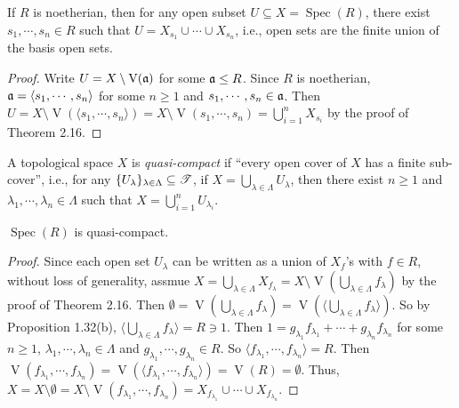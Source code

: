 \begin{proposition}
    If $R$ is noetherian, then for any open subset $U \subseteq X = \operatorname{Spec}(R)$, there exist $s_1,\cdots,s_n \in R$ such that $U = X_{s_1} \cup \cdots \cup X_{s_n}$, i.e., open sets are the finite union of the basis open sets.
\end{proposition}

\begin{proof}
    Write $U = X \setminus \operatorname{V}(\mathfrak{a})$ for some $\mathfrak{a} \leq R$. Since $R$ is noetherian, $\mathfrak{a} = \langle s_1,\cdots,s_n \rangle$ for some $n \geq 1$ and $s_1,\cdots,s_n \in \mathfrak{a}$. Then $U = X \setminus \operatorname{V}(\langle s_1,\cdots,s_n \rangle) = X \setminus \operatorname{V}(s_1,\cdots,s_n) = \bigcup_{i=1}^n X_{s_i}$ by the proof of Theorem 2.16.
\end{proof}

\begin{definition}
    A topological space $X$ is \emph{quasi-compact} if ``every open cover of $X$ has a finite sub-cover'', i.e., for any $\{U_\lambda\}_{\lambda \in \Lambda} \subseteq \mathscr{T}$, if $X = \bigcup_{\lambda \in \Lambda} U_\lambda$, then there exist $n \geq 1$ and $\lambda_1,\cdots,\lambda_n \in \Lambda$ such that $X = \bigcup_{i=1}^n U_{\lambda_i}$.
\end{definition}

\begin{theorem}
    $\operatorname{Spec}(R)$ is quasi-compact.
\end{theorem}

\begin{proof}
    Since each open set $U_\lambda$ can be written as a union of $X_f$'s with $f \in R$, without loss of generality, assmue $X = \bigcup_{\lambda \in \Lambda} X_{f_\lambda} = X \setminus \operatorname{V}(\bigcup_{\lambda \in \Lambda}f_{\lambda})$ by the proof of Theorem 2.16. Then $\emptyset = \operatorname{V}(\bigcup_{\lambda \in \Lambda}f_{\lambda}) = \operatorname{V}(\langle \bigcup_{\lambda \in \Lambda}f_{\lambda} \rangle)$. So by Proposition 1.32(b), $\langle \bigcup_{\lambda \in \Lambda}f_{\lambda} \rangle = R \ni 1$. Then $1 = g_{\lambda_1} f_{\lambda_1} + \cdots + g_{\lambda_n}f_{\lambda_n}$ for some $n \geq 1$, $\lambda_1,\cdots,\lambda_n \in \Lambda$ and $g_{\lambda_1},\cdots,g_{\lambda_n} \in R$. So $\langle f_{\lambda_1},\cdots,f_{\lambda_n} \rangle = R$. Then $\operatorname{V}(f_{\lambda_1},\cdots,f_{\lambda_n}) = \operatorname{V}(\langle f_{\lambda_1},\cdots,f_{\lambda_n} \rangle) = \operatorname{V}(R) = \emptyset$. Thus, $X = X \setminus \emptyset = X \setminus \operatorname{V}(f_{\lambda_1},\cdots,f_{\lambda_n}) = X_{f_{\lambda_1}} \cup \cdots \cup X_{f_{\lambda_n}}$.
\end{proof}

